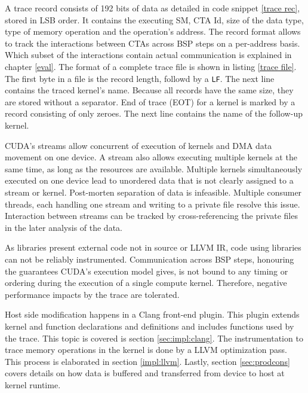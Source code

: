 A trace record consists of 192 bits of data as detailed in code snippet \ref{trace rec}, stored in LSB order. It contains the executing SM, CTA Id, size of the data type, type of memory operation and the operation's address. The record format allows to track the interactions between CTAs across BSP steps on a per-address basis. Which subset of the interactions contain actual communication is explained in chapter \ref{eval}.
The format of a complete trace file is shown in listing \ref{trace file}. The first byte in a file is the record length, followd by a \verb|LF|. The next line contains the
traced kernel's name. Because all records have the same size, they are stored without a separator. End of trace (EOT) for a kernel is marked by a record consisting of only zeroes. The next line contains the name of the follow-up kernel.

CUDA's streams allow concurrent of execution of kernels and DMA data movement on one device.
A stream also allows executing multiple kernels at the same time, as long as the resources are available. Multiple kernels simultaneously executed on one device lead to unordered data that is not clearly assigned to a stream or kernel. Post-morten separation of data is infeasible. Multiple consumer threads, each handling one stream and writing to a private file resolve this issue. Interaction between streams can be tracked by cross-referencing the private files in the later analysis of the data.


As libraries present external code not in source or LLVM IR, code using libraries can not be reliably instrumented. Communication across
BSP steps, honouring the guarantees CUDA's execution model gives, is not bound to any timing or ordering during the execution of a single compute
kernel. Therefore, negative performance impacts by the trace are tolerated.


Host side modification happens in a Clang front-end plugin. This plugin extends kernel and function declarations and definitions and includes functions used by the trace. This topic is covered is section \ref{sec:impl:clang}. The instrumentation to trace memory operations in the kernel is done by a LLVM optimization pass. This process is elaborated in section \ref{impl:llvm}. Lastly, section \ref{sec:prodcons} covers details on how data is buffered and transferred from device to host at kernel runtime.



